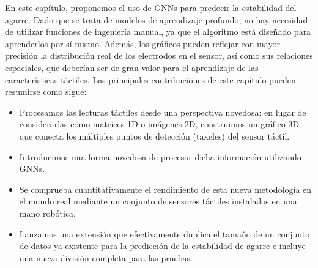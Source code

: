 En este capítulo, proponemos el uso de \acp{GNN} para predecir la estabilidad del agarre. Dado que se trata de modelos de aprendizaje profundo, no hay necesidad de utilizar funciones de ingeniería manual, ya que el algoritmo está diseñado para aprenderlos por sí mismo. Además, los gráficos pueden reflejar con mayor precisión la distribución real de los electrodos en el sensor, así como sus relaciones espaciales, que deberían ser de gran valor para el aprendizaje de las características táctiles. Las principales contribuciones de este capítulo pueden resumirse como sigue:

\begin{itemize}
	\item Procesamos las lecturas táctiles desde una perspectiva novedosa: en lugar de considerarlas como matrices 1D o imágenes 2D, construimos un gráfico 3D que conecta los múltiples puntos de detección (taxeles) del sensor táctil.

	\item Introducimos una forma novedosa de procesar dicha información utilizando \acfp{GNN}.

	\item Se comprueba cuantitativamente el rendimiento de esta nueva metodología en el mundo real mediante un conjunto de sensores táctiles instalados en una mano robótica.

	\item Lanzamos una extensión que efectivamente duplica el tamaño de un conjunto de datos ya existente \cite{Zapata2018} para la predicción de la estabilidad de agarre e incluye una nueva división completa para las pruebas.
\end{itemize}